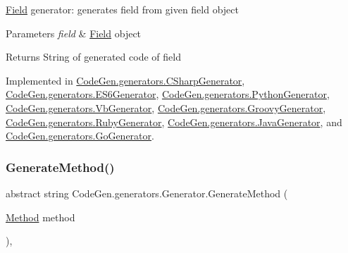 \mbox{\hyperlink{classCodeGen_1_1generators_1_1Field}{Field}} generator\+: generates field from given field object 


\begin{DoxyParams}{Parameters}
{\em field} & \mbox{\hyperlink{classCodeGen_1_1generators_1_1Field}{Field}} object\\
\hline
\end{DoxyParams}
\begin{DoxyReturn}{Returns}
String of generated code of field
\end{DoxyReturn}


Implemented in \mbox{\hyperlink{classCodeGen_1_1generators_1_1CSharpGenerator_a72ff9ea0d6e5119e5a720eb54a952201}{Code\+Gen.\+generators.\+C\+Sharp\+Generator}}, \mbox{\hyperlink{classCodeGen_1_1generators_1_1ES6Generator_a35f257a51768270892dfa05dcf2c64c0}{Code\+Gen.\+generators.\+E\+S6\+Generator}}, \mbox{\hyperlink{classCodeGen_1_1generators_1_1PythonGenerator_aafd171ffd14980515eef644b929bd712}{Code\+Gen.\+generators.\+Python\+Generator}}, \mbox{\hyperlink{classCodeGen_1_1generators_1_1VbGenerator_a114f5fcd8cc13180701041b6d9815f3f}{Code\+Gen.\+generators.\+Vb\+Generator}}, \mbox{\hyperlink{classCodeGen_1_1generators_1_1GroovyGenerator_a8ccffd1ee31dfad7f7599ab0bca0dc6b}{Code\+Gen.\+generators.\+Groovy\+Generator}}, \mbox{\hyperlink{classCodeGen_1_1generators_1_1RubyGenerator_a08fbd6d88c129901aa159e3a9a706278}{Code\+Gen.\+generators.\+Ruby\+Generator}}, \mbox{\hyperlink{classCodeGen_1_1generators_1_1JavaGenerator_a84c05958d52e40e29a5a2157de4579e2}{Code\+Gen.\+generators.\+Java\+Generator}}, and \mbox{\hyperlink{classCodeGen_1_1generators_1_1GoGenerator_aa7417b36b964e679a37dfee960148768}{Code\+Gen.\+generators.\+Go\+Generator}}.

\mbox{\label{classCodeGen_1_1generators_1_1Generator_a04fc9bd217b3b8c3d5f7b1a3f92c79d3}} 
\subsubsection{\texorpdfstring{Generate\+Method()}{GenerateMethod()}}
{\footnotesize\ttfamily abstract string Code\+Gen.\+generators.\+Generator.\+Generate\+Method (\begin{DoxyParamCaption}\item[{\mbox{\hyperlink{classCodeGen_1_1generators_1_1Method}{Method}}}]{method }\end{DoxyParamCaption})\hspace{0.3cm}{\ttfamily [protected]}, {}}



